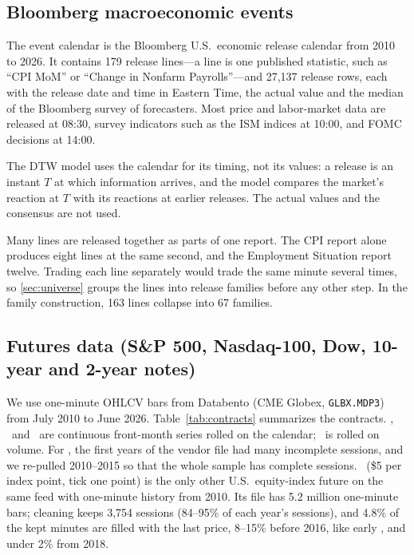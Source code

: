 
\subsection{Bloomberg macroeconomic events}\label{sec:bbg}

The event calendar is the Bloomberg U.S.\ economic release calendar from 2010 to 2026. It
contains 179 release lines---a line is one published statistic, such as ``CPI MoM'' or ``Change
in Nonfarm Payrolls''---and 27,137 release rows, each with the release date and time in Eastern
Time, the actual value and the median of the Bloomberg survey of forecasters. Most price and
labor-market data are released at 08:30, survey indicators such as the ISM indices at 10:00,
and FOMC decisions at 14:00.

The DTW model uses the calendar for its timing, not its values: a release is an instant $T$ at
which information arrives, and the model compares the market's reaction at $T$ with its reactions
at earlier releases. The actual values and the consensus are not used.

Many lines are released together as parts of one report. The CPI report alone produces eight
lines at the same second, and the Employment Situation report twelve. Trading each line
separately would trade the same minute several times, so \ref{sec:universe} groups the
lines into release families before any other step. In the family construction, 163 lines
collapse into 67 families.

\subsection{Futures data (S\&P 500, Nasdaq-100, Dow, 10-year and 2-year notes)}\label{sec:futures}

We use one-minute OHLCV bars from Databento (CME Globex, \texttt{GLBX.MDP3}) from July 2010 to
June 2026. Table~\ref{tab:contracts} summarizes the contracts. \ES, \NQ\ and \YM\ are continuous
front-month series rolled on the calendar; \ZN\ is rolled on volume. For \ES, the first years of
the vendor file had many incomplete sessions, and we re-pulled 2010--2015 so that the whole
sample has complete sessions. \YM\ (\$5 per index point, tick one point) is the only other
U.S.\ equity-index future on the same feed with one-minute history from 2010. Its file has 5.2
million one-minute bars; cleaning keeps 3,754 sessions (84--95\% of each year's sessions), and
4.8\% of the kept minutes are filled with the last price, 8--15\% before 2016, like early \NQ,
and under 2\% from 2018.

